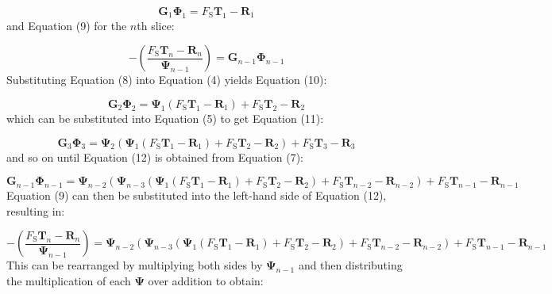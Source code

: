\documentclass[12pt]{article}
\begin{document}
\begin{displaymath}
{\symbf{G}}_{1} {\symbf{Φ}}_{1}={F_{\text{S}}} {\symbf{T}}_{1}-{\symbf{R}}_{1}
\end{displaymath}
and Equation (9) for the $n$th slice:

\begin{displaymath}
-\left(\frac{{F_{\text{S}}} {\symbf{T}}_{n}-{\symbf{R}}_{n}}{{\symbf{Ψ}}_{n-1}}\right)={\symbf{G}}_{n-1} {\symbf{Φ}}_{n-1}
\end{displaymath}
Substituting Equation (8) into Equation (4) yields Equation (10):

\begin{displaymath}
{\symbf{G}}_{2} {\symbf{Φ}}_{2}={\symbf{Ψ}}_{1} \left({F_{\text{S}}} {\symbf{T}}_{1}-{\symbf{R}}_{1}\right)+{F_{\text{S}}} {\symbf{T}}_{2}-{\symbf{R}}_{2}
\end{displaymath}
which can be substituted into Equation (5) to get Equation (11):

\begin{displaymath}
{\symbf{G}}_{3} {\symbf{Φ}}_{3}={\symbf{Ψ}}_{2} \left({\symbf{Ψ}}_{1} \left({F_{\text{S}}} {\symbf{T}}_{1}-{\symbf{R}}_{1}\right)+{F_{\text{S}}} {\symbf{T}}_{2}-{\symbf{R}}_{2}\right)+{F_{\text{S}}} {\symbf{T}}_{3}-{\symbf{R}}_{3}
\end{displaymath}
and so on until Equation (12) is obtained from Equation (7):

\begin{displaymath}
{\symbf{G}}_{n-1} {\symbf{Φ}}_{n-1}={\symbf{Ψ}}_{n-2} \left({\symbf{Ψ}}_{n-3} \left({\symbf{Ψ}}_{1} \left({F_{\text{S}}} {\symbf{T}}_{1}-{\symbf{R}}_{1}\right)+{F_{\text{S}}} {\symbf{T}}_{2}-{\symbf{R}}_{2}\right)+{F_{\text{S}}} {\symbf{T}}_{n-2}-{\symbf{R}}_{n-2}\right)+{F_{\text{S}}} {\symbf{T}}_{n-1}-{\symbf{R}}_{n-1}
\end{displaymath}
Equation (9) can then be substituted into the left-hand side of Equation (12), resulting in:

\begin{displaymath}
-\left(\frac{{F_{\text{S}}} {\symbf{T}}_{n}-{\symbf{R}}_{n}}{{\symbf{Ψ}}_{n-1}}\right)={\symbf{Ψ}}_{n-2} \left({\symbf{Ψ}}_{n-3} \left({\symbf{Ψ}}_{1} \left({F_{\text{S}}} {\symbf{T}}_{1}-{\symbf{R}}_{1}\right)+{F_{\text{S}}} {\symbf{T}}_{2}-{\symbf{R}}_{2}\right)+{F_{\text{S}}} {\symbf{T}}_{n-2}-{\symbf{R}}_{n-2}\right)+{F_{\text{S}}} {\symbf{T}}_{n-1}-{\symbf{R}}_{n-1}
\end{displaymath}
This can be rearranged by multiplying both sides by ${\symbf{Ψ}}_{n-1}$ and then distributing the multiplication of each $\symbf{Ψ}$ over addition to obtain:
\end{document}
